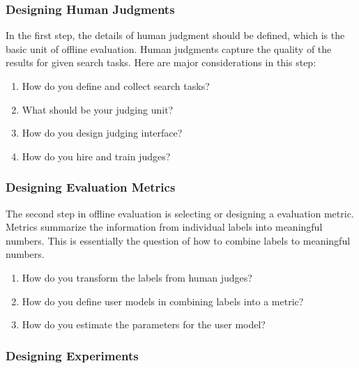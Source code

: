 \subsubsection{Designing Human Judgments}

In the first step, the details of human judgment should be defined, which is the basic unit of offline evaluation. Human judgments capture the quality of the results for given search tasks. Here are major considerations in this step:

\begin{enumerate}
	\item How do you define and collect search tasks?
	\item What should be your judging unit?
	\item How do you design judging interface?
	\item How do you hire and train judges?
\end{enumerate}

\subsubsection{Designing Evaluation Metrics}

The second step in offline evaluation is selecting or designing a  evaluation metric. Metrics summarize the information from individual labels into meaningful numbers. This is essentially the question of how to combine labels to meaningful numbers.

\begin{enumerate}
	\item How do you transform the labels from human judges?
	\item How do you define user models in combining labels into a metric?
	\item How do you estimate the parameters for the user model?
\end{enumerate}

\subsubsection{Designing Experiments}

